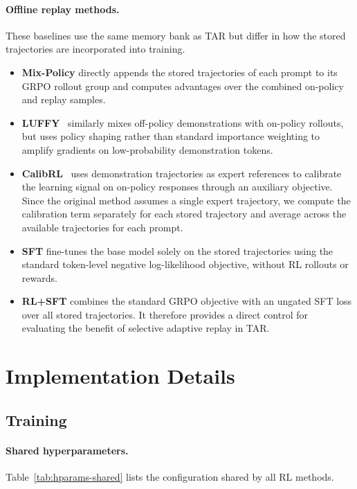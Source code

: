 \documentclass[11pt]{article}
\newcommand{\model}{\textsc{TAR}\xspace}
\begin{document}
\paragraph{Offline replay methods.}
These baselines use the same memory bank as \model but differ in how the stored trajectories are incorporated into training.
\begin{itemize}[leftmargin=*,nosep]
    \item \textbf{Mix-Policy} directly appends the stored trajectories of each prompt to its GRPO rollout group and computes advantages over the combined on-policy and replay samples.
    \item \textbf{LUFFY}~\cite{luffy} similarly mixes off-policy demonstrations with on-policy rollouts, but uses policy shaping rather than standard importance weighting to amplify gradients on low-probability demonstration tokens.
    \item \textbf{CalibRL}~\cite{huang2026controllable} uses demonstration trajectories as expert references to calibrate the learning signal on on-policy responses through an auxiliary objective.
    Since the original method assumes a single expert trajectory, we compute the calibration term separately for each stored trajectory and average across the available trajectories for each prompt.
    \item \textbf{SFT} fine-tunes the base model solely on the stored trajectories using the standard token-level negative log-likelihood objective, without RL rollouts or rewards.
    \item \textbf{RL+SFT} combines the standard GRPO objective with an ungated SFT loss over all stored trajectories. It therefore provides a direct control for evaluating the benefit of selective adaptive replay in \model.
\end{itemize}

\section{Implementation Details}
\label{app:impl}

\subsection{Training}

\paragraph{Shared hyperparameters.}
Table~\ref{tab:hparams-shared} lists the configuration shared by all RL methods.
\end{document}
